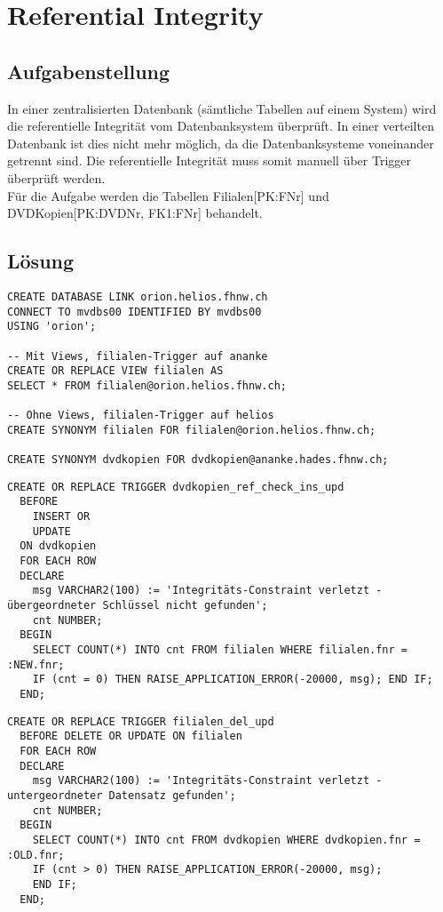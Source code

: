 \documentclass[a4paper,10pt,titlepage=false]{scrreprt}
\begin{document}
\section{Referential Integrity}
\subsection{Aufgabenstellung}
In einer zentralisierten Datenbank (sämtliche Tabellen auf einem System) wird die referentielle Integrität vom Datenbanksystem überprüft. In einer verteilten Datenbank ist dies nicht mehr möglich, da die Datenbanksysteme voneinander getrennt sind. Die referentielle Integrität muss somit manuell über Trigger überprüft werden.\\
Für die Aufgabe werden die Tabellen Filialen[PK:FNr] und DVDKopien[PK:DVDNr, FK1:FNr] behandelt.
\subsection{Lösung}
\begin{lstlisting}[style=sql, title=Link ananke <=> helios]
CREATE DATABASE LINK orion.helios.fhnw.ch
CONNECT TO mvdbs00 IDENTIFIED BY mvdbs00
USING 'orion';

-- Mit Views, filialen-Trigger auf ananke
CREATE OR REPLACE VIEW filialen AS
SELECT * FROM filialen@orion.helios.fhnw.ch;

-- Ohne Views, filialen-Trigger auf helios
CREATE SYNONYM filialen FOR filialen@orion.helios.fhnw.ch;

CREATE SYNONYM dvdkopien FOR dvdkopien@ananke.hades.fhnw.ch;
\end{lstlisting}
\begin{lstlisting}[style=sql, title=FILIALEN-Trigger auf ananke]
CREATE OR REPLACE TRIGGER dvdkopien_ref_check_ins_upd
  BEFORE
    INSERT OR
    UPDATE
  ON dvdkopien
  FOR EACH ROW
  DECLARE
    msg VARCHAR2(100) := 'Integritäts-Constraint verletzt - übergeordneter Schlüssel nicht gefunden';
    cnt NUMBER;
  BEGIN
    SELECT COUNT(*) INTO cnt FROM filialen WHERE filialen.fnr = :NEW.fnr;
    IF (cnt = 0) THEN RAISE_APPLICATION_ERROR(-20000, msg); END IF;
  END;
\end{lstlisting}
\begin{lstlisting}[style=sql, title=DVDKOPIEN-Trigger auf helios]
CREATE OR REPLACE TRIGGER filialen_del_upd
  BEFORE DELETE OR UPDATE ON filialen
  FOR EACH ROW
  DECLARE 
    msg VARCHAR2(100) := 'Integritäts-Constraint verletzt - untergeordneter Datensatz gefunden';
    cnt NUMBER;
  BEGIN
    SELECT COUNT(*) INTO cnt FROM dvdkopien WHERE dvdkopien.fnr = :OLD.fnr;
    IF (cnt > 0) THEN RAISE_APPLICATION_ERROR(-20000, msg);
    END IF;
  END;
\end{lstlisting}
\end{document}
